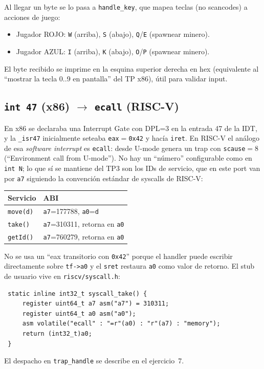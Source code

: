 Al llegar un byte se lo pasa a \texttt{handle\_key}, que mapea teclas (no scancodes) a acciones de juego:

\begin{itemize}
  \item Jugador ROJO: \texttt{W} (arriba), \texttt{S} (abajo), \texttt{Q}/\texttt{E} (spawnear minero).
  \item Jugador AZUL: \texttt{I} (arriba), \texttt{K} (abajo), \texttt{O}/\texttt{P} (spawnear minero).
\end{itemize}

El byte recibido se imprime en la esquina superior derecha en hex (equivalente al ``mostrar la tecla 0..9 en pantalla''
del TP x86), útil para validar input.

\subsection{\texttt{int 47} (x86) $\to$ \texttt{ecall} (RISC-V)}

En x86 se declaraba una Interrupt Gate con DPL=3 en la entrada 47 de la IDT, y la \texttt{\_isr47} inicialmente seteaba
\texttt{eax}$=$\texttt{0x42} y hacía \texttt{iret}. En RISC-V el análogo de esa \emph{software interrupt} es
\texttt{ecall}: desde U-mode genera un trap con \texttt{scause}$=$8 (``Environment call from U-mode''). No hay un
``número'' configurable como en \texttt{int N}; lo que sí se mantiene del TP3 son los IDs de servicio, que en este port
van por \texttt{a7} siguiendo la convención estándar de syscalls de RISC-V:

\begin{center}
\begin{tabular}{l|l}
\textbf{Servicio} & \textbf{ABI} \\
\hline
\texttt{move(d)} & \texttt{a7}=177788, \texttt{a0}=\texttt{d} \\
\texttt{take()}  & \texttt{a7}=310311, retorna en \texttt{a0} \\
\texttt{getId()} & \texttt{a7}=760279, retorna en \texttt{a0} \\
\end{tabular}
\end{center}

No se usa un ``eax transitorio con \texttt{0x42}'' porque el handler puede escribir directamente sobre \texttt{tf->a0} y
el \texttt{sret} restaura \texttt{a0} como valor de retorno. El stub de usuario vive en \texttt{riscv/syscall.h}:

\begin{codesnippet}
\begin{verbatim}
 static inline int32_t syscall_take() {
     register uint64_t a7 asm("a7") = 310311;
     register uint64_t a0 asm("a0");
     asm volatile("ecall" : "=r"(a0) : "r"(a7) : "memory");
     return (int32_t)a0;
 }
\end{verbatim}
\end{codesnippet}

El despacho en \texttt{trap\_handle} se describe en el ejercicio~7.
